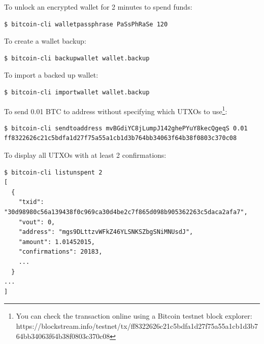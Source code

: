 \noindent To unlock an encrypted wallet for 2 minutes to spend funds:
\begin{emphbox}
\begin{lstlisting}[style=Bash]
$ bitcoin-cli walletpassphrase PaSsPhRaSe 120
\end{lstlisting}
\end{emphbox}
\vspace{1em}

\noindent To create a wallet backup:
\begin{emphbox}
\begin{lstlisting}[style=Bash]
$ bitcoin-cli backupwallet wallet.backup
\end{lstlisting}
\end{emphbox}
\vspace{1em}

\noindent To import a backed up wallet:
\begin{emphbox}
\begin{lstlisting}[style=Bash]
$ bitcoin-cli importwallet wallet.backup
\end{lstlisting}
\end{emphbox}
\vspace{1em}

\noindent To send 0.01 BTC to address  without specifying which UTXOs to use\footnote{You can check the transaction online using a Bitcoin testnet block explorer: https://blockstream.info/testnet/tx/ff8322626c21c5bdfa1d27f75a55a1cb1d3b764bb34063f64b38f0803c370c08}:
\begin{emphbox}
\begin{lstlisting}[style=Bash]
$ bitcoin-cli sendtoaddress mvBGdiYC8jLumpJ142ghePYuY8kecQgeqS 0.01
ff8322626c21c5bdfa1d27f75a55a1cb1d3b764bb34063f64b38f0803c370c08
\end{lstlisting}
\end{emphbox}
\vspace{1em}

\noindent To display all UTXOs with at least 2 confirmations:
\begin{emphbox}
\begin{lstlisting}[style=Bash]
$ bitcoin-cli listunspent 2
[
  {
    "txid": "30d98980c56a139438f0c969ca30d4be2c7f865d098b905362263c5daca2afa7",
    "vout": 0,
    "address": "mgs9DLttzvWFkZ46YLSNKSZbgSNiMNUsdJ",
    "amount": 1.01452015,
    "confirmations": 20183,
    ...
  }
... 
]
\end{lstlisting}
\end{emphbox}
\vspace{1em}

